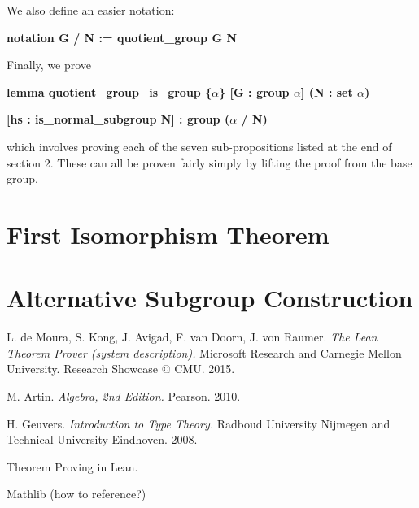 \documentclass[runningheads,a4paper]{llncs}
\renewcommand{\a}{\alpha}
\renewcommand{\-}{\setminus}
\begin{document}
We also define an easier notation:

\vspace{2 mm}
\hspace{2 em}\textbf{notation G / N := quotient\_group G N}
\vspace{2 mm}

Finally, we prove

\vspace{2 mm}
\hspace{2 em}\textbf{lemma quotient\_group\_is\_group \{$\a$\} [G : group $\a$] (N : set $\a$)}

\hspace{4 em}\textbf{[hs : is\_normal\_subgroup N] : group ($\a$ / N)}
\vspace{2 mm}

which involves proving each of the seven sub-propositions listed at the end of section 2. These can all be proven fairly simply by lifting the proof from the base group.

\section{First Isomorphism Theorem}


\section{Alternative Subgroup Construction}



\begin{thebibliography}{1}

 L. de Moura, S. Kong, J. Avigad, F. van Doorn, J. von Raumer. {\em The Lean Theorem Prover (system description).} Microsoft Research and Carnegie Mellon University. Research Showcase @ CMU. 2015.

 M. Artin. {\em Algebra, 2nd Edition.} Pearson. 2010.

 H. Geuvers. {\em Introduction to Type Theory.} Radboud University Nijmegen and Technical University Eindhoven. 2008.

 Theorem Proving in Lean.

 Mathlib (how to reference?)

\end{thebibliography}
\end{document}

